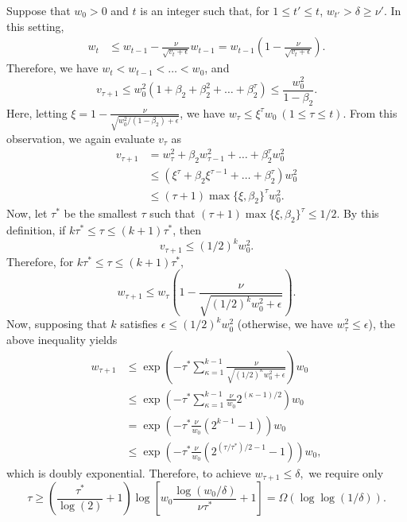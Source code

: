 \documentclass[conference]{IEEEtran}
\begin{document}
Suppose that $w_0 > 0$ and $t$ is an integer such that, for $1 \leq t' \leq  t$, $w_{t'} > \delta \geq \nu'$.
In this setting, 
\begin{align*}
w_t & \leq w_{t-1} - \frac{\nu}{\sqrt{v_t + \epsilon}}  w_{t-1}  
 = w_{t-1} \left( 1 - \frac{\nu}{\sqrt{v_t + \epsilon}} \right).
\end{align*}
Therefore, we have $w_t < w_{t-1} < \dots < w_0$, and 
$$
v_{\tau +1} \leq w_0^2 (1 + \beta_2 + \beta_2^2 + \dots + \beta_2^\tau) \leq 
\frac{ w_0^2}{1 - \beta_2}.
$$
Here, letting $\xi = 1-\frac{\nu }{\sqrt{w_0^2/(1 - \beta_2) + \epsilon}}$, we have $w_{\tau} \leq \xi^{\tau} w_0~(1\leq \tau \leq t)$.
From this observation, 
we again evaluate $v_\tau$ as
\begin{align*}
v_{\tau+1} 
&	= w_\tau^2 + \beta_2 w_{\tau-1}^2 + \dots + \beta_2^\tau w_0^2 \\
&	\leq (\xi^\tau + \beta_2 \xi^{\tau-1} + \dots + \beta_2^\tau)w_0^2 \\
&	\leq (\tau + 1) \max\{\xi,\beta_2\}^\tau w_0^2.
\end{align*}
Now, let $\tau^*$ be the smallest $\tau$ such that $(\tau + 1) \max\{\xi,\beta_2\}^\tau
\leq 1/2$.
By this definition, 
if $k \tau^* \leq \tau \leq (k+1)\tau^*$, then
$$v_{\tau + 1} \leq (1/2)^k w_0^2.$$
Therefore, for $k \tau^* \leq \tau \leq (k+1)\tau^*$, 
$$
w_{\tau + 1} \leq w_{\tau}\left( 1 - \frac{\nu}{\sqrt{(1/2)^k w_0^2 + \epsilon}} \right).
$$
Now, supposing that $k$ satisfies $\epsilon \leq (1/2)^kw_0^2$ (otherwise, we have $w_\tau^2 \leq \epsilon$), the above inequality yields
\begin{align*}
w_{\tau  + 1}
& \leq \exp\left(  -  \tau^* \sum_{\kappa=1}^{k-1} \frac{\nu}{\sqrt{(1/2)^\kappa w_0^2 + \epsilon}}  \right) w_0 \\
& \leq \exp\left(  -  \tau^* \sum_{\kappa=1}^{k-1} \frac{\nu}{w_0} 2^{(\kappa-1)/2}\right) w_0 \\
& 
= \exp\left(  -  \tau^* \frac{\nu}{w_0} (2^{k-1}-1)  \right) w_0  \\
& \leq \exp\left(  -  \tau^* \frac{\nu}{w_0} (2^{(\tau/\tau^*)/2 -1}-1) \right) w_0,
\end{align*}
which is doubly exponential. Therefore, to achieve 
$
w_{\tau+1} \leq \delta,
$
we require only 
$$
\tau \geq \left(\frac{\tau^* }{\log(2)} + 1\right) \log \left[ w_0 \frac{\log \left( w_0/\delta  \right) }{\nu \tau^* } + 1\right]
= \Omega(\log\log(1/\delta)).
$$
\end{document}
